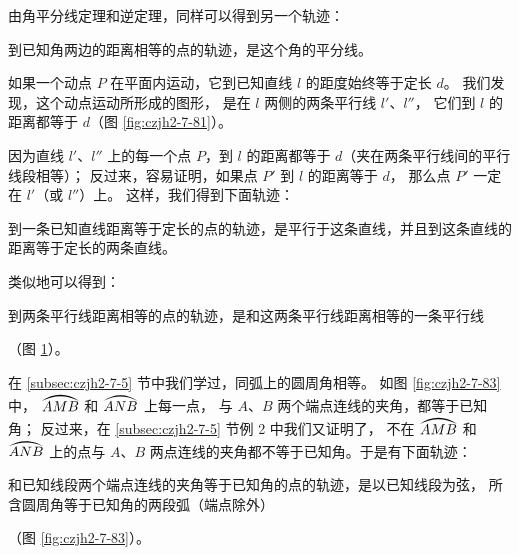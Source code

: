 由角平分线定理和逆定理，同样可以得到另一个轨迹：

\begin{xingzhi}[轨迹3]
    到已知角两边的距离相等的点的轨迹，是这个角的平分线。
\end{xingzhi}

如果一个动点 $P$ 在平面内运动，它到已知直线 $l$ 的距度始终等于定长 $d$。
我们发现，这个动点运动所形成的图形， 是在 $l$ 两侧的两条平行线 $l'$、$l''$，
它们到 $l$ 的距离都等于 $d$（图 \ref{fig:czjh2-7-81}）。

\begin{figure}[htbp]
    \centering
    \begin{minipage}[b]{7cm}
        \centering
        
        \caption{}\label{fig:czjh2-7-81}
    \end{minipage}
    \qquad
    \begin{minipage}[b]{7cm}
        \centering
        
        \caption{}\label{fig:czjh2-7-82}
    \end{minipage}
\end{figure}

因为直线 $l'$、$l''$ 上的每一个点 $P$，到 $l$ 的距离都等于 $d$（夹在两条平行线间的平行线段相等）；
反过来，容易证明，如果点 $P'$ 到 $l$ 的距离等于 $d$， 那么点 $P'$ 一定在 $l'$（或 $l''$）上。
这样，我们得到下面轨迹：

\begin{xingzhi}[轨迹4]
    到一条已知直线距离等于定长的点的轨迹，是平行于这条直线，并且到这条直线的距离等于定长的两条直线。
\end{xingzhi}

类似地可以得到：

\begin{xingzhi}[轨迹5]
    到两条平行线距离相等的点的轨迹，是和这两条平行线距离相等的一条平行线
\end{xingzhi}（图 \ref{fig:czjh2-7-82}）。

在 \ref{subsec:czjh2-7-5} 节中我们学过，同弧上的圆周角相等。
如图 \ref{fig:czjh2-7-83} 中， $\yuanhu{AMB}$ 和 $\yuanhu{ANB}$ 上每一点，
与 $A$、$B$ 两个端点连线的夹角，都等于已知角；
反过来，在 \ref{subsec:czjh2-7-5} 节例 2 中我们又证明了， 不在 $\yuanhu{AMB}$ 和 $\yuanhu{ANB}$ 上的点与
$A$、$B$ 两点连线的夹角都不等于已知角。于是有下面轨迹：

\begin{xingzhi}[轨迹6]
    和已知线段两个端点连线的夹角等于已知角的点的轨迹，是以已知线段为弦，
    所含圆周角等于已知角的两段弧（端点除外）
\end{xingzhi}（图 \ref{fig:czjh2-7-83}）。

